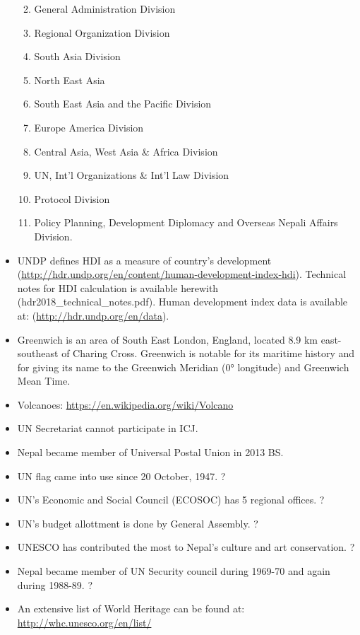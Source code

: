 \documentclass[
]{book}
\providecommand{\tightlist}{%
  \setlength{\itemsep}{0pt}\setlength{\parskip}{0pt}}
\begin{document}
\begin{itemize}
  \begin{enumerate}
  \def\labelenumi{\arabic{enumi}.}
  \tightlist
  \item
    General Administration Division
  \item
    Regional Organization Division
  \item
    South Asia Division
  \item
    North East Asia
  \item
    South East Asia and the Pacific Division
  \item
    Europe America Division
  \item
    Central Asia, West Asia \& Africa Division
  \item
    UN, Int'l Organizations \& Int'l Law Division
  \item
    Protocol Division
  \item
    Policy Planning, Development Diplomacy and Overseas Nepali Affairs Division.
  \end{enumerate}
\item
  UNDP defines HDI as a measure of country's development (\url{http://hdr.undp.org/en/content/human-development-index-hdi}). Technical notes for HDI calculation is available herewith (hdr2018\_technical\_notes.pdf). Human development index data is available at: (\url{http://hdr.undp.org/en/data}).
\item
  Greenwich is an area of South East London, England, located 8.9 km east-southeast of Charing Cross. Greenwich is notable for its maritime history and for giving its name to the Greenwich Meridian (0° longitude) and Greenwich Mean Time.
\item
  Volcanoes: \url{https://en.wikipedia.org/wiki/Volcano}
\item
  UN Secretariat cannot participate in ICJ.
\item
  Nepal became member of Universal Postal Union in 2013 BS.
\item
  UN flag came into use since 20 October, 1947. ?
\item
  UN's Economic and Social Council (ECOSOC) has 5 regional offices. ?
\item
  UN's budget allottment is done by General Assembly. ?
\item
  UNESCO has contributed the most to Nepal's culture and art conservation. ?
\item
  Nepal became member of UN Security council during 1969-70 and again during 1988-89. ?
\item
  An extensive list of World Heritage can be found at: \url{http://whc.unesco.org/en/list/}

\end{itemize}
\end{document}
